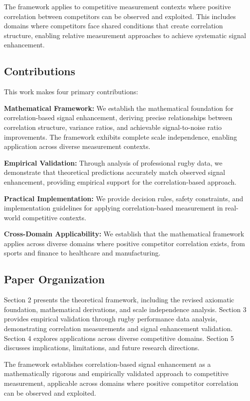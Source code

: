 The framework applies to competitive measurement contexts where positive correlation between competitors can be observed and exploited. This includes domains where competitors face shared conditions that create correlation structure, enabling relative measurement approaches to achieve systematic signal enhancement.

\subsection{Contributions}

This work makes four primary contributions:

\textbf{Mathematical Framework:} We establish the mathematical foundation for correlation-based signal enhancement, deriving precise relationships between correlation structure, variance ratios, and achievable signal-to-noise ratio improvements. The framework exhibits complete scale independence, enabling application across diverse measurement contexts.

\textbf{Empirical Validation:} Through analysis of professional rugby data, we demonstrate that theoretical predictions accurately match observed signal enhancement, providing empirical support for the correlation-based approach.

\textbf{Practical Implementation:} We provide decision rules, safety constraints, and implementation guidelines for applying correlation-based measurement in real-world competitive contexts.

\textbf{Cross-Domain Applicability:} We establish that the mathematical framework applies across diverse domains where positive competitor correlation exists, from sports and finance to healthcare and manufacturing.

\subsection{Paper Organization}

Section 2 presents the theoretical framework, including the revised axiomatic foundation, mathematical derivations, and scale independence analysis. Section 3 provides empirical validation through rugby performance data analysis, demonstrating correlation measurements and signal enhancement validation. Section 4 explores applications across diverse competitive domains. Section 5 discusses implications, limitations, and future research directions.

The framework establishes correlation-based signal enhancement as a mathematically rigorous and empirically validated approach to competitive measurement, applicable across domains where positive competitor correlation can be observed and exploited.